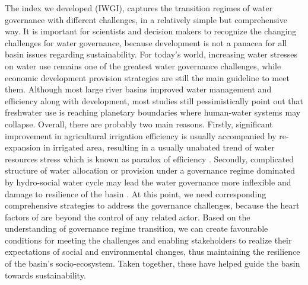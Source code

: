 \documentclass[9pt, twocolumn, twoside, lineno]{pnas-new}
\begin{document}
The index we developed (IWGI), captures the transition regimes of water governance with different challenges, in a relatively simple but comprehensive way.
It is important for scientists and decision makers to recognize the changing challenges for water governance, because development is not a panacea for all basin issues regarding sustainability.
For today's world, increasing water stresses on water use remains one of the greatest water governance challenges, while economic development provision strategies are still the main guideline to meet them. 
Although most large river basins improved water management and efficiency along with development, most studies still pessimistically point out that freshwater use is reaching planetary boundaries where human-water systems may collapse.
Overall, there are probably two main reasons.
Firstly, significant improvement in agricultural irrigation efficiency is usually accompanied by re-expansion in irrigated area, resulting in a usually unabated trend of water resources stress which is known as paradox of efficiency 
\cite{graftonParadoxIrrigationEfficiency2018}. 
Secondly, complicated structure of water allocation or provision under a governance regime dominated by hydro-social water cycle may lead the water governance more inflexible and damage to resilience of the basin
\cite{qinFlexibilityIntensityGlobal2019}.
At this point, we need corresponding comprehensive strategies to address the governance challenges, because the heart factors of are beyond the control of any related actor. 
Based on the understanding of governance regime transition, we can create favourable conditions for meeting the challenges and enabling stakeholders to realize their expectations of social and environmental changes, thus maintaining the resilience of the basin's socio-ecosystem.
Taken together, these have helped guide the basin towards sustainability.
\end{document}
